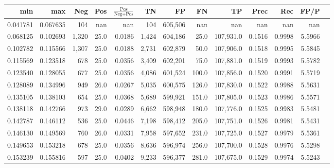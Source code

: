 \begin{tabular}{rrrrrrrrrrrrr}
\toprule
     min &      max &   Neg &  Pos & $\frac{\text{Pos}}{\text{Neg}+\text{Pos}}$ &      TN &      FP &        FN &        TP &   Prec &    Rec &   FP/P \\
\midrule
0.041781 & 0.067635 &   104 &  nan &                                        nan &     104 & 605,506 &       nan &       nan &    nan &    nan &    nan \\
0.068125 & 0.102693 & 1,320 & 25.0 &                                     0.0186 &   1,424 & 604,186 &      25.0 & 107,931.0 & 0.1516 & 0.9998 & 5.5966 \\
0.102782 & 0.115566 & 1,307 & 25.0 &                                     0.0188 &   2,731 & 602,879 &      50.0 & 107,906.0 & 0.1518 & 0.9995 & 5.5845 \\
0.115569 & 0.123518 &   678 & 25.0 &                                     0.0356 &   3,409 & 602,201 &      75.0 & 107,881.0 & 0.1519 & 0.9993 & 5.5782 \\
0.123540 & 0.128055 &   677 & 25.0 &                                     0.0356 &   4,086 & 601,524 &     100.0 & 107,856.0 & 0.1520 & 0.9991 & 5.5719 \\
0.128089 & 0.134996 &   949 & 26.0 &                                     0.0267 &   5,035 & 600,575 &     126.0 & 107,830.0 & 0.1522 & 0.9988 & 5.5631 \\
0.135105 & 0.138103 &   654 & 25.0 &                                     0.0368 &   5,689 & 599,921 &     151.0 & 107,805.0 & 0.1523 & 0.9986 & 5.5571 \\
0.138118 & 0.142766 &   973 & 29.0 &                                     0.0289 &   6,662 & 598,948 &     180.0 & 107,776.0 & 0.1525 & 0.9983 & 5.5481 \\
0.142787 & 0.146112 &   536 & 25.0 &                                     0.0446 &   7,198 & 598,412 &     205.0 & 107,751.0 & 0.1526 & 0.9981 & 5.5431 \\
0.146130 & 0.149569 &   760 & 26.0 &                                     0.0331 &   7,958 & 597,652 &     231.0 & 107,725.0 & 0.1527 & 0.9979 & 5.5361 \\
0.149653 & 0.153218 &   678 & 25.0 &                                     0.0356 &   8,636 & 596,974 &     256.0 & 107,700.0 & 0.1528 & 0.9976 & 5.5298 \\
0.153239 & 0.155816 &   597 & 25.0 &                                     0.0402 &   9,233 & 596,377 &     281.0 & 107,675.0 & 0.1529 & 0.9974 & 5.5243 \\

\end{tabular}

